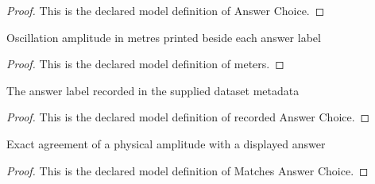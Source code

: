 \begin{proof}
  This is the declared model definition of Answer Choice.
\end{proof}
\begin{definition}[meters]
  \label{def:physics:phyx-mini-0271:phyxminiproblems-problemphyxmini0271-answerchoice-meters}
  Oscillation amplitude in metres printed beside each answer label
\end{definition}
\begin{proof}
  This is the declared model definition of meters.
\end{proof}
\begin{definition}
  \label{def:physics:phyx-mini-0271:phyxminiproblems-problemphyxmini0271-recordedanswerchoice}
  The answer label recorded in the supplied dataset metadata
\end{definition}
\begin{proof}
  This is the declared model definition of recorded Answer Choice.
\end{proof}
\begin{definition}
  \label{def:physics:phyx-mini-0271:phyxminiproblems-problemphyxmini0271-matchesanswerchoice}
  Exact agreement of a physical amplitude with a displayed answer
\end{definition}
\begin{proof}
  This is the declared model definition of Matches Answer Choice.
\end{proof}
